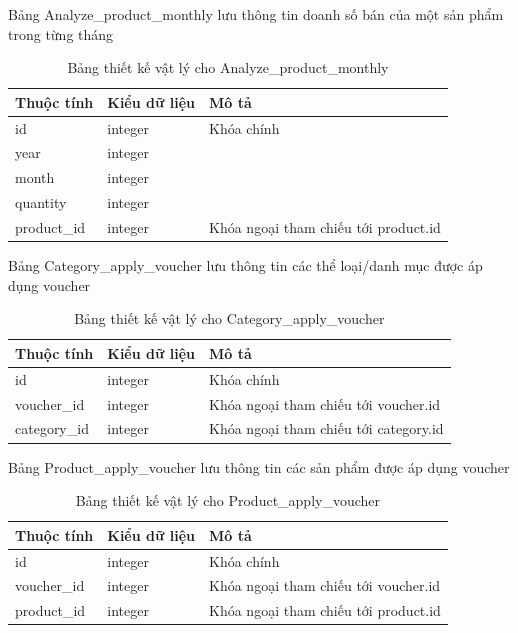 \newpage
\noindent Bảng Analyze\_product\_monthly lưu thông tin doanh số bán của một sản phẩm trong từng tháng
\begin{table}[H]
\centering
\begin{tabular}{|p{4cm}|p{3cm}|p{7cm}|}
\hline
Thuộc tính & Kiểu dữ liệu & Mô tả \\
\hline
id & integer & Khóa chính \\
\hline
year & integer & \\
\hline
month & integer & \\
\hline
quantity & integer & \\
\hline
product\_id & integer & Khóa ngoại tham chiếu tới product.id \\
\hline

\end{tabular}
\caption{Bảng thiết kế vật lý cho Analyze\_product\_monthly}
\end{table}

\noindent Bảng Category\_apply\_voucher lưu thông tin các thể loại/danh mục được áp dụng voucher
\begin{table}[H]
\centering
\begin{tabular}{|p{4cm}|p{3cm}|p{7cm}|}
\hline
Thuộc tính & Kiểu dữ liệu & Mô tả \\
\hline
id & integer & Khóa chính \\
\hline
voucher\_id & integer & Khóa ngoại tham chiếu tới voucher.id \\
\hline
category\_id & integer & Khóa ngoại tham chiếu tới category.id\\
\hline
\end{tabular}
\caption{Bảng thiết kế vật lý cho Category\_apply\_voucher}
\end{table}

\noindent Bảng Product\_apply\_voucher lưu thông tin các sản phẩm được áp dụng voucher
\begin{table}[H]
\centering
\begin{tabular}{|p{4cm}|p{3cm}|p{7cm}|}
\hline
Thuộc tính & Kiểu dữ liệu & Mô tả \\
\hline
id & integer & Khóa chính \\
\hline
voucher\_id & integer & Khóa ngoại tham chiếu tới voucher.id \\
\hline
product\_id & integer & Khóa ngoại tham chiếu tới product.id\\
\hline
\end{tabular}
\caption{Bảng thiết kế vật lý cho Product\_apply\_voucher}
\end{table}



   
